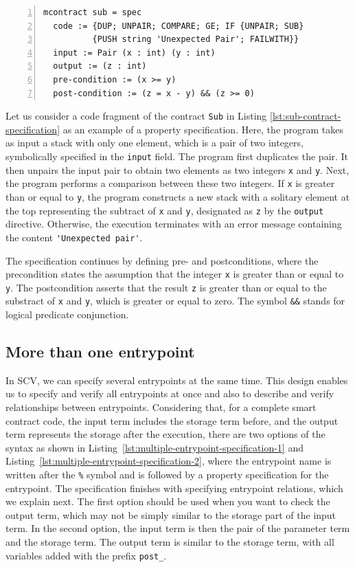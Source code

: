 \documentclass[a4paper,USenglish,cleveref, autoref,anonymous]{lipics-v2021}
\begin{document}
\begin{lstlisting}[float,captionpos=b,caption={Specification of Sub contract},label={lst:sub-contract-specification},numbers=left]
mcontract sub = spec
  code := {DUP; UNPAIR; COMPARE; GE; IF {UNPAIR; SUB} 
          {PUSH string 'Unexpected Pair'; FAILWITH}}
  input := Pair (x : int) (y : int)
  output := (z : int)
  pre-condition := (x >= y)
  post-condition := (z = x - y) && (z >= 0)
\end{lstlisting}

Let us consider a code fragment of the contract \texttt{Sub}  in Listing
\ref{lst:sub-contract-specification} as an example of a property
specification.  Here, the program takes as input a stack with only one
element, which is a pair of two integers, symbolically specified in
the \lstinline|input| field. The program first duplicates the pair. It
then unpairs the input pair to obtain two elements as two integers
\lstinline/x/ and \lstinline/y/. 
Next, the program performs a comparison between
these two integers. If \lstinline/x/ is greater than or equal to
\lstinline/y/, the program constructs a new stack with a solitary
element at the top representing the subtract of  \lstinline/x/ and
\lstinline/y/, designated as \lstinline/z/ by the \lstinline|output| directive. Otherwise, the execution
terminates with an error message containing the content
\lstinline|'Unexpected pair'|.

The specification continues by defining
pre- and postconditions, where the precondition states the assumption
that the integer \lstinline/x/ is greater than or equal to  \lstinline/y/. The postcondition asserts that the result
\lstinline/z/ is greater than or equal to the substract of
\lstinline/x/ and \lstinline/y/, which is greater or equal to
zero. The symbol \lstinline/&&/ stands for logical predicate
conjunction. 

\subsection{More than one entrypoint}
\label{sec:more-than-one}
In SCV, we can specify several entrypoints at the same
time. This design enables us to specify and verify all entrypoints
at once and also to describe and verify relationships between
entrypoints.  Considering that, for a complete smart contract code, the input term includes the storage term before, and the output term represents the storage after the execution, there are two options of the syntax as shown in Listing~\ref {lst:multiple-entrypoint-specification-1} and Listing~\ref {lst:multiple-entrypoint-specification-2},
where the entrypoint name is written after the \lstinline/%/ symbol
and is followed by a property specification for the entrypoint. The
specification finishes with specifying entrypoint relations,
which we explain next.  The first option should be used when you want to check the output term, which may not be simply similar to the storage part of the input term. In the second option, the input term is then the pair of the parameter term and the storage term. The output term is similar to the storage term, with all variables added with the prefix \lstinline/post_/.
\end{document}
